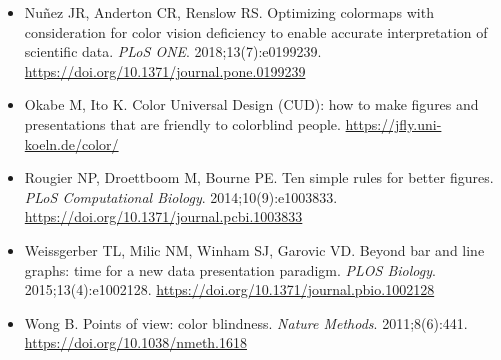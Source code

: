 \begin{itemize}
\item Nu\~nez JR, Anderton CR, Renslow RS. Optimizing colormaps with consideration for color vision deficiency to enable accurate interpretation of scientific data. \emph{PLoS ONE}. 2018;13(7):e0199239. \url{https://doi.org/10.1371/journal.pone.0199239}
\item Okabe M, Ito K. Color Universal Design (CUD): how to make figures and presentations that are friendly to colorblind people. \url{https://jfly.uni-koeln.de/color/}
\item Rougier NP, Droettboom M, Bourne PE. Ten simple rules for better figures. \emph{PLoS Computational Biology}. 2014;10(9):e1003833. \url{https://doi.org/10.1371/journal.pcbi.1003833}
\item Weissgerber TL, Milic NM, Winham SJ, Garovic VD. Beyond bar and line graphs: time for a new data presentation paradigm. \emph{PLOS Biology}. 2015;13(4):e1002128. \url{https://doi.org/10.1371/journal.pbio.1002128}
\item Wong B. Points of view: color blindness. \emph{Nature Methods}. 2011;8(6):441. \url{https://doi.org/10.1038/nmeth.1618}
\end{itemize}

